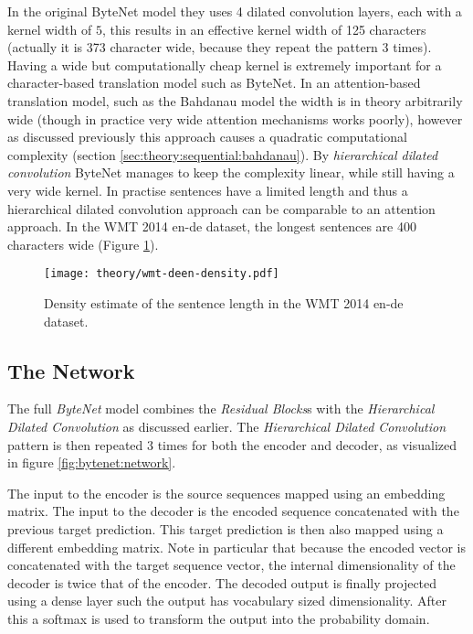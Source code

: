 In the original ByteNet model they uses 4 dilated convolution layers, each with a kernel width of $5$, this results in an effective kernel width of 125 characters (actually it is 373 character wide, because they repeat the pattern 3 times). Having a wide but computationally cheap kernel is extremely important for a character-based translation model such as ByteNet. In an attention-based translation model, such as the Bahdanau model \cite{bahdanau-nmt} the width is in theory arbitrarily wide (though in practice very wide attention mechanisms works poorly), however as discussed previously this approach causes a quadratic computational complexity (section \ref{sec:theory:sequential:bahdanau}). By \textit{hierarchical dilated convolution} ByteNet manages to keep the complexity linear, while still having a very wide kernel. In practise sentences have a limited length and thus a hierarchical dilated convolution approach can be comparable to an attention approach. In the WMT 2014 en-de dataset, the longest sentences are 400 characters wide (Figure \ref{fig:bytenet:wmt-deen-density}).

\begin{figure}[h]
    \centering
    \texttt{[image: theory/wmt-deen-density.pdf]}
    \caption{Density estimate of the sentence length in the WMT 2014 en-de dataset.}
    \label{fig:bytenet:wmt-deen-density}
\end{figure}

\subsection{The Network}

The full \textit{ByteNet} model combines the \textit{Residual Blocks}s with the \textit{Hierarchical Dilated Convolution} as discussed earlier. The \textit{Hierarchical Dilated Convolution} pattern is then repeated 3 times for both the encoder and decoder, as visualized in figure \ref{fig:bytenet:network}.

The input to the encoder is the source sequences mapped using an embedding matrix. The input to the decoder is the encoded sequence concatenated with the previous target prediction. This target prediction is then also mapped using a different embedding matrix. Note in particular that because the encoded vector is concatenated with the target sequence vector, the internal dimensionality of the decoder is twice that of the encoder. The decoded output is finally projected using a dense layer such the output has vocabulary sized dimensionality. After this a softmax is used to transform the output into the probability domain.

